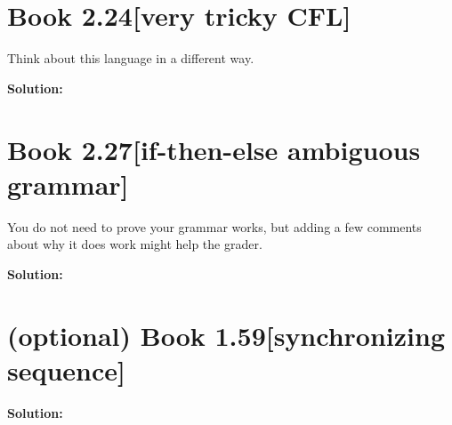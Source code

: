 \documentclass[11pt]{article}
\newenvironment{question}[2]
{\newpage\section{#1\texorpdfstring{\hfill}{horizontal spacing}{\rm\normalsize #2}}}{}
\newenvironment{solution}
{\textbf{Solution: }\color{blue}}
{\color{black}}
\begin{document}

\begin{question}{Book 2.24}{[very tricky CFL]}
Think about this language in a different way.


\begin{solution}

\end{solution}
\end{question}


\begin{question}{Book 2.27}{[if-then-else ambiguous grammar]}
You do not need to prove your grammar works, but adding a few comments about why it does work might help the grader.


\begin{solution}

\end{solution}
\end{question}


\begin{question}{(optional) Book 1.59}{[synchronizing sequence]}


\begin{solution}

\end{solution}
\end{question}
\end{document}
